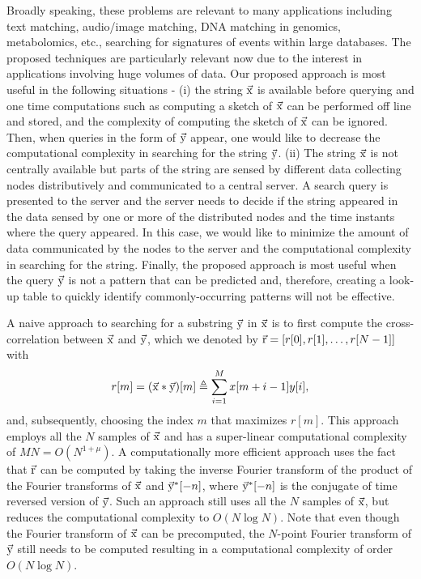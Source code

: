 Broadly speaking, these problems are relevant to many applications including text matching, audio/image matching, DNA matching in genomics, metabolomics, etc., searching for signatures of events within large databases. The proposed techniques are particularly relevant now due to the interest in applications involving huge volumes of data. Our proposed approach is most useful in the following situations - (i) the string $\vec{\mathrm{x}}$ is available before querying and one time computations such as computing a sketch of $\vec{\mathrm{x}}$ can be performed off line and stored, and the complexity of computing the sketch of $\vec{\mathrm{x}}$ can be ignored. Then, when queries in the form of $\vec{\mathrm{y}}$ appear, one would like to decrease the computational complexity in searching for the string $\vec{\mathrm{y}}$. (ii) The string $\vec{\mathrm{x}}$ is not centrally available but parts of the string are sensed by different data collecting nodes distributively and communicated to a central server. A search query is presented to the server and the server needs to decide if the string appeared in the data sensed by one or more of the distributed nodes and the time instants where the query appeared. In this case, we would like to minimize the amount of data communicated by the nodes to the server and the computational complexity in searching for the string. Finally, the proposed approach is most useful when the query $\vec{\mathrm{y}}$ is not a pattern that can be predicted and, therefore, creating a look-up table to quickly identify commonly-occurring patterns will not be effective.

A naive approach to searching for a substring $\vec{\mathrm{y}}$ in $\vec{\mathrm{x}}$ is to first compute the cross-correlation between $\vec{\mathrm{x}}$ and $\vec{\mathrm{y}}$, which we denoted by $\vec{\mathrm{r}}=[r[0], r[1],\ldots, r[N-1]]$ with
\begin{align}
\label{Eqn:DefCrossCorrelation}
r[m]=(\vec{\mathrm{x}}*\vec{\mathrm{y}})[m] \triangleq \sum_{i=1}^{M} x[m+i-1] y[i] ,
\end{align}
and, subsequently,  choosing the index $m$ that maximizes $r[m]$. This approach employs all the $N$ samples of $\vec{\mathrm{x}}$ and has a super-linear computational complexity of $MN = O(N^{1+\mu})$. A computationally more efficient approach uses the fact that $\vec{\mathrm{r}}$ can be computed by taking the inverse Fourier transform of the product of the Fourier transforms of $\vec{\mathrm{x}}$ and $ \vec{\mathrm{y}}^*[-n]$, where $\vec{\mathrm{y}}^*[-n]$ is the conjugate of time reversed version of $\vec{\mathrm{y}}$. Such an approach still uses all the $N$ samples of $\vec{\mathrm{x}}$, but reduces the computational complexity to $O(N \log N)$. Note that even though the Fourier transform of $\vec{\mathrm{x}}$ can be precomputed, the $N$-point Fourier transform of $\vec{\mathrm{y}}$ still needs to be computed resulting in a computational complexity of order $O(N \log N)$.

